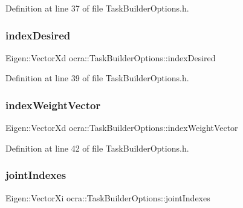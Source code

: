 Definition at line 37 of file Task\+Builder\+Options.\+h.

\hypertarget{classocra_1_1TaskBuilderOptions_ade41a041d05ccafcf6c5de4bcedd13e1}{}\label{classocra_1_1TaskBuilderOptions_ade41a041d05ccafcf6c5de4bcedd13e1} 
\subsubsection{\texorpdfstring{index\+Desired}{indexDesired}}
{\footnotesize\ttfamily Eigen\+::\+Vector\+Xd ocra\+::\+Task\+Builder\+Options\+::index\+Desired}



Definition at line 39 of file Task\+Builder\+Options.\+h.

\hypertarget{classocra_1_1TaskBuilderOptions_a04ebfb8955859ffc40087d3e7b53e0d2}{}\label{classocra_1_1TaskBuilderOptions_a04ebfb8955859ffc40087d3e7b53e0d2} 
\subsubsection{\texorpdfstring{index\+Weight\+Vector}{indexWeightVector}}
{\footnotesize\ttfamily Eigen\+::\+Vector\+Xd ocra\+::\+Task\+Builder\+Options\+::index\+Weight\+Vector}



Definition at line 42 of file Task\+Builder\+Options.\+h.

\hypertarget{classocra_1_1TaskBuilderOptions_ad5c32b5777c20dc348b80959574d4a37}{}\label{classocra_1_1TaskBuilderOptions_ad5c32b5777c20dc348b80959574d4a37} 
\subsubsection{\texorpdfstring{joint\+Indexes}{jointIndexes}}
{\footnotesize\ttfamily Eigen\+::\+Vector\+Xi ocra\+::\+Task\+Builder\+Options\+::joint\+Indexes}




